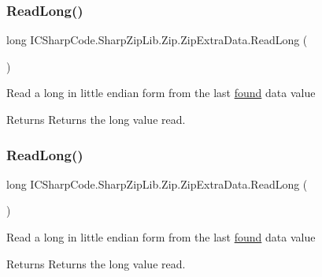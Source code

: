 \subsubsection{\texorpdfstring{Read\+Long()}{ReadLong()}\hspace{0.1cm}{\footnotesize\ttfamily [1/2]}}
{\footnotesize\ttfamily long I\+C\+Sharp\+Code.\+Sharp\+Zip\+Lib.\+Zip.\+Zip\+Extra\+Data.\+Read\+Long (\begin{DoxyParamCaption}{ }\end{DoxyParamCaption})\hspace{0.3cm}{\ttfamily [inline]}}



Read a long in little endian form from the last \hyperlink{class_i_c_sharp_code_1_1_sharp_zip_lib_1_1_zip_1_1_zip_extra_data_a91e0c6c1d11967653256ccb161f9818c}{found} data value 

\begin{DoxyReturn}{Returns}
Returns the long value read.
\end{DoxyReturn}
\mbox{\label{class_i_c_sharp_code_1_1_sharp_zip_lib_1_1_zip_1_1_zip_extra_data_a06f9836c2c567c9f223810d3e2d9b51c}} 
\subsubsection{\texorpdfstring{Read\+Long()}{ReadLong()}\hspace{0.1cm}{\footnotesize\ttfamily [2/2]}}
{\footnotesize\ttfamily long I\+C\+Sharp\+Code.\+Sharp\+Zip\+Lib.\+Zip.\+Zip\+Extra\+Data.\+Read\+Long (\begin{DoxyParamCaption}{ }\end{DoxyParamCaption})\hspace{0.3cm}{\ttfamily [inline]}}



Read a long in little endian form from the last \hyperlink{class_i_c_sharp_code_1_1_sharp_zip_lib_1_1_zip_1_1_zip_extra_data_a91e0c6c1d11967653256ccb161f9818c}{found} data value 

\begin{DoxyReturn}{Returns}
Returns the long value read.
\end{DoxyReturn}
\mbox{\label{class_i_c_sharp_code_1_1_sharp_zip_lib_1_1_zip_1_1_zip_extra_data_a13e4cefe2f4873f46fc93cc043852e57}} 
